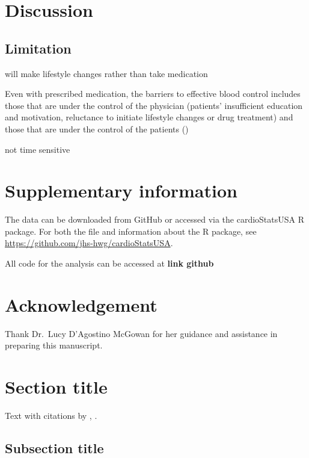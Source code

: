\documentclass[useAMS,usenatbib,referee]{biom}
\begin{document}
\hypertarget{discussion}{%
\section{Discussion}\label{discussion}}

\hypertarget{limitation}{%
\subsection{Limitation}\label{limitation}}

will make lifestyle changes rather than take medication

Even with prescribed medication, the barriers to effective blood control
includes those that are under the control of the physician (patients'
insufficient education and motivation, reluctance to initiate lifestyle
changes or drug treatment) and those that are under the control of the
patients () \citep{dusing_overcoming_2006}

not time sensitive

\hypertarget{supplement}{%
\section{Supplementary information}\label{supplement}}

The data can be downloaded from GitHub or accessed via the
cardioStatsUSA R package. For both the file and information about the R
package, see \url{https://github.com/jhs-hwg/cardioStatsUSA}.

All code for the analysis can be accessed at \textbf{link github}

\hypertarget{acknowledge}{%
\section{Acknowledgement}\label{acknowledge}}

Thank Dr.~Lucy D'Agostino McGowan for her guidance and assistance in
preparing this manuscript.

\hypertarget{sec:1}{%
\section{Section title}\label{sec:1}}

Text with citations by \citet{heagerty2000time},
\citep{pepe2003statistical}.

\hypertarget{sec:2}{%
\subsection{Subsection title}\label{sec:2}}
\end{document}

